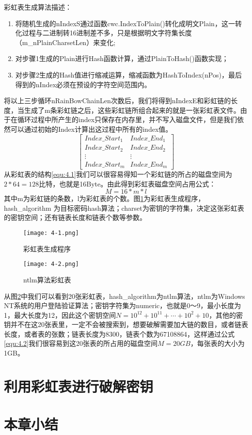 彩虹表生成算法描述：
\begin{enumerate}
\item 将随机生成的nIndexS通过函数cwc.IndexToPlain()转化成明文Plain，这一转化过程与二进制转16进制差不多，只是根据明文字符集长度（m\_nPlainCharsetLen）来变化;
\item 对步骤1生成的Plain进行Hash函数计算，通过PlainToHash()函数实现；
\item 对步骤2生成的Hash值进行缩减运算，缩减函数为HashToIndex(nPos)，最后得到的nIndex必须在预设的字符空间范围内。
\end{enumerate}

将以上三步循环nRainBowChainLen次数后，我们将得到nIndexE和彩虹链的长度，当生成了m条彩虹链之后，这些彩虹链所组合起来的就是一张彩虹表文件。由于在循环过程中所产生的index只保存在内存里，并不写入磁盘文件，但是我们依然可以通过初始的Index计算出这过程中所有的index值。
\begin{equation}
\label{equ:4.1}
\begin{bmatrix}
Index\_Start_1 & Index\_End_1 \\
Index\_Start_2 & Index\_End_2 \\
\vdots  & \vdots \\
Index\_Start_m & Index\_End_m 
\end{bmatrix}
\end{equation}
从彩虹表的结构\eqref{equ:4.1}我们可以很容易得知一个彩虹链的所占的磁盘空间为$2*64=128$比特，也就是16Byte。由此得到彩虹表磁盘空间占用公式：
\begin{equation}
\label{equ:4.2}
M=16*m*l
\end{equation}
其中m为彩虹链的条数，l为彩虹表的个数。图\ref{fig:4.1}为彩虹表生成程序，hash\_algorithm 为目标密码hash算法；charset为密钥的字符集，决定这张彩虹表的密钥空间；还有链表长度和链表个数等参数。
\begin{figure}[!ht]
\centering
\texttt{[image: 4-1.png]}
\caption{彩虹表生成程序}
\label{fig:4.1}
\end{figure}

\begin{figure}[!ht]
\centering
\texttt{[image: 4-2.png]}
\caption{ntlm算法彩虹表}
\label{fig:4.2}
\end{figure}
从图\ref{fig:4.2}中我们可以看到20张彩虹表，hash\_algorithm为ntlm算法，ntlm为Windows NT系统的用户登陆验证算法；密钥字符集为numeric，也就是0～9，最小长度为1，最大长度为12，因此这个密钥空间$N=10^{12}+10^{11}+ \cdots +10^2 +10$，其他的密钥并不在这20张表里，一定不会被搜索到，想要破解需要加大链的数目，或者链表长度，或者表的张数；链表长度为8300，链表个数为67108864，这样通过公式\eqref{equ:4.2}我们很容易到这20张表的所占用的磁盘空间$M=20GB$，每张表的大小为1GB。
\section{利用彩虹表进行破解密钥}
\section{本章小结}
